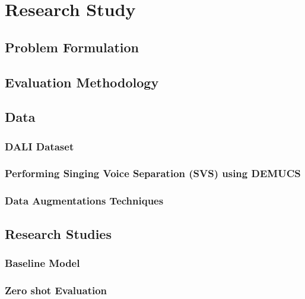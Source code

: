 
\chapter{Research Study}%
\label{sec:researchstudy}


\section{Problem Formulation}%
\label{sec:problemformulation}

\section{Evaluation Methodology}%
\label{sec:evaluationmetric}

\section{Data}%
\label{sec:data}


\subsection{DALI Dataset}
\label{dalidataset}


\subsection{Performing Singing Voice Separation (SVS) using DEMUCS}%
\label{sec:svsusingdemucs}


\subsection{Data Augmentations Techniques}%
\label{sec:dataaugmentations}

\section{Research Studies}%
\label{sec:experiments}

\subsection{Baseline Model}%
\label{sec:baseline}

\subsection{Zero shot Evaluation}%
\label{sec:svsusingdemucs}

